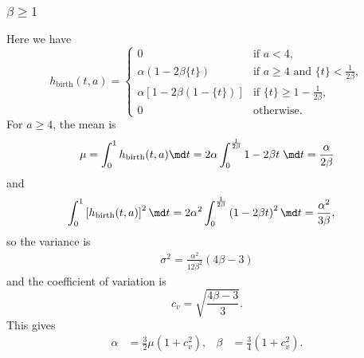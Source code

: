 \documentclass{jpmarticle}
\begin{document}
\subsubsection{$\beta \geq 1$}

Here we have
\begin{equation}
  h_{\text{birth}}(t, a) =
  \begin{cases}
    0 & \text{if $a < 4$},
    \\
    \alpha \left(1 - 2 \beta \{t\}\right)
    & \text{if $a \geq 4$ and $\{t\} < \frac{1}{2 \beta}$},
    \\
    \alpha \left[1 - 2 \beta (1 - \{t\})\right]
    & \text{if $\{t\} \geq 1 - \frac{1}{2 \beta}$},
    \\
    0 & \text{otherwise}.
  \end{cases}
\end{equation}
For $a \geq 4$, the mean is
\begin{align}
  \mu = \int_0^1 h_{\text{birth}}(t, a) \md t
  = 2 \alpha \int_0^{\frac{1}{2 \beta}} 1 - 2 \beta t \; \md t
  = \frac{\alpha}{2 \beta}
\end{align}
and
\begin{align}
  \int_0^1 \left[h_{\text{birth}}(t, a)\right]^2 \md t
  & = 2 \alpha^2 \int_0^{\frac{1}{2 \beta}} \left(1 - 2 \beta t\right)^2 \md t
  = \frac{\alpha^2}{3 \beta},
\end{align}
so the variance is
\begin{align}
  \sigma^2 = \frac{\alpha^2}{12 \beta^2} (4 \beta - 3)
\end{align}
and the coefficient of variation is
\begin{equation}
  c_v = \sqrt{\frac{4 \beta - 3}{3}}.
\end{equation}
This gives
\begin{align}
  \alpha &= \frac{3}{2} \mu \left(1 + c_v^2\right),
  &
  \beta &= \frac{3}{4} \left(1 + c_v^2\right).
\end{align}
\end{document}
